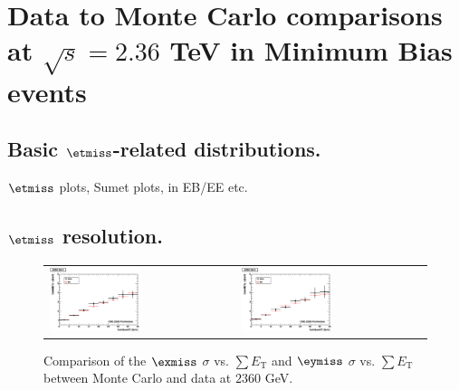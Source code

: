 \section{Data to Monte Carlo comparisons at $\sqrt{s}=2.36$ TeV in
  Minimum Bias events}


\subsection{Basic $\etmiss$-related distributions.}
$\etmiss$ plots, Sumet plots, in EB/EE etc.

\subsection{$\etmiss$ resolution.}

\begin{figure}[h!]
 \centering
 \begin{tabular}{ll}
  \includegraphics[width=0.5\textwidth]{plots_DataVsMC_MB_2360GeV/h_metxsigma_sumet_2360.eps} &
  \includegraphics[width=0.5\textwidth]{plots_DataVsMC_MB_2360GeV/h_metysigma_sumet_2360.eps} \\
 \end{tabular}
 \caption{\small Comparison of the $\exmiss$ $\sigma$ vs. $\sum E_\text{T}$ and $\eymiss$ $\sigma$ vs. $\sum E_\text{T}$ between 
          Monte Carlo and data at $2360$ GeV.\label{fig:MExySigma_vs_SumET_2360}}
\end{figure}

